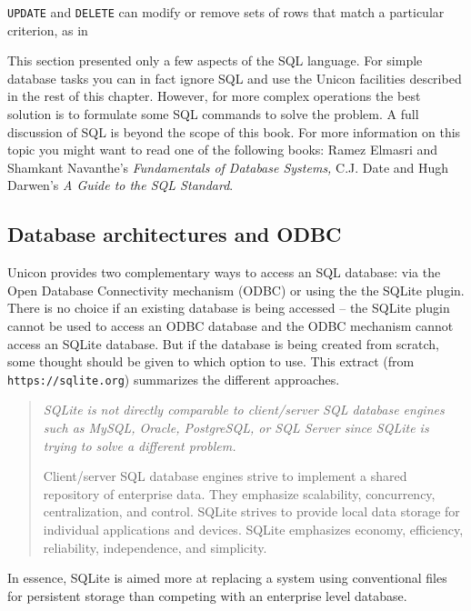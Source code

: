 
\texttt{UPDATE} and \texttt{DELETE} can modify or remove sets of rows
that match a particular criterion, as in


This section presented only a few aspects of the SQL language. For
simple database tasks you can in fact ignore SQL and use the Unicon
facilities described in the rest of this chapter. However, for more
complex operations the best solution is to formulate some SQL commands
to solve the problem. A full discussion of SQL is beyond the scope of
this book. For more information on this topic you might want to read
one of the following books: Ramez Elmasri and Shamkant
Navanthe's \textit{Fundamentals of Database Systems,}
C.J. Date and Hugh Darwen's \textit{A Guide to the SQL Standard}.

\subsection*{Database architectures and ODBC}

Unicon provides two complementary ways to access an SQL database: via the
Open Database Connectivity mechanism (ODBC) or using the the SQLite
plugin. There is no choice if an existing database is being accessed --
the SQLite plugin cannot be used to access an ODBC database and the ODBC
mechanism cannot access an SQLite database. But if the database is being
created from scratch, some thought should be given to which option to
use. This extract (from \texttt{https://sqlite.org}) summarizes the
different approaches.
\begin{quote}
 {\sl
 SQLite is not directly comparable to client/server SQL database engines
 such as MySQL, Oracle, PostgreSQL, or SQL Server since SQLite is trying
 to solve a different problem.

 Client/server SQL database engines strive to implement a shared
 repository of enterprise data. They emphasize scalability, concurrency,
 centralization, and control. SQLite strives to provide local data
 storage for individual applications and devices. SQLite emphasizes
 economy, efficiency, reliability, independence, and simplicity.
 }
\end{quote}
In essence, SQLite is aimed more at replacing a system using conventional files
for persistent storage than competing with an enterprise level database.

